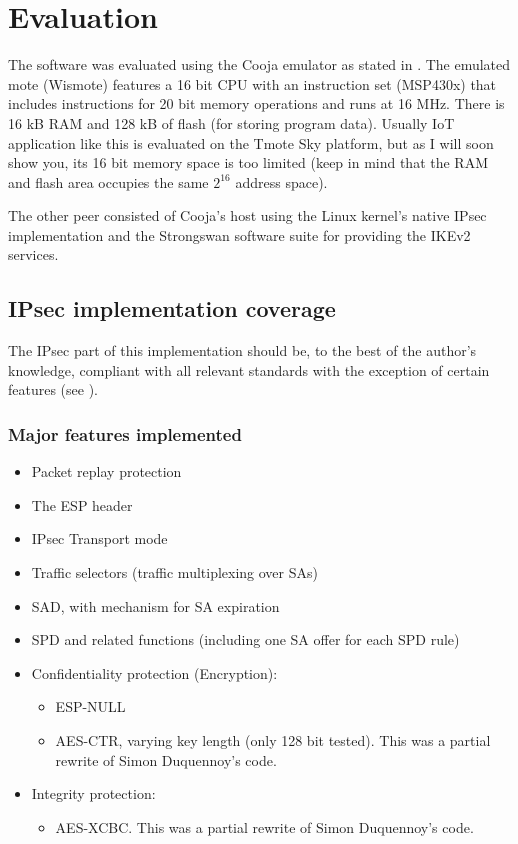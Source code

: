 \documentclass[final,a4paper,twoside,11pt,onecolumn]{report}
\begin{document}
\chapter{Evaluation}
\label{cha:eval}
The software was evaluated using the Cooja emulator as stated in . The emulated mote (Wismote) features a 16 bit CPU with an instruction set (MSP430x) that includes instructions for 20 bit memory operations and runs at 16 MHz. There is 16 kB RAM and 128 kB of flash (for storing program data). Usually IoT application like this is evaluated on the Tmote Sky platform, but as I will soon show you, its 16 bit memory space is too limited (keep in mind that the RAM and flash area occupies the same $2^16$ address space).

The other peer consisted of Cooja's host using the Linux kernel's native IPsec implementation and the Strongswan software suite for providing the IKEv2 services.

\section{IPsec implementation coverage}
The IPsec part of this implementation should be, to the best of the author's knowledge, compliant with all relevant standards with the exception of certain features (see ).

\subsection{Major features implemented}
\begin{itemize}
   \item Packet replay protection
   \item The ESP header
   \item IPsec Transport mode
   \item Traffic selectors (traffic multiplexing over SAs)
   \item SAD, with mechanism for SA expiration
   \item SPD and related functions (including one SA offer for each SPD rule)
   \item Confidentiality protection (Encryption): 
   \begin{itemize}
      \item ESP-NULL
      \item AES-CTR, varying key length (only 128 bit tested). This was a partial rewrite of Simon Duquennoy's code.
   \end{itemize}
   \item Integrity protection:
   \begin{itemize}
           \item AES-XCBC. This was a partial rewrite of Simon Duquennoy's code.
   \end{itemize}
\end{itemize}
\end{document}
